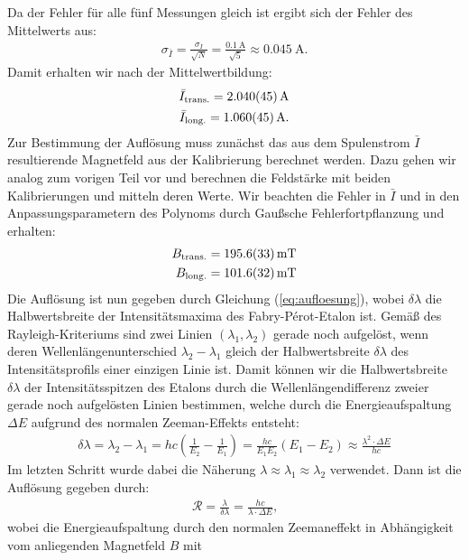 \documentclass[11pt, a4paper]{article}
\begin{document}
Da der Fehler für alle fünf Messungen gleich ist ergibt sich der Fehler des Mittelwerts aus: 
\begin{align*}
	\sigma_{\bar{I}} = \frac{\sigma_I}{\sqrt{N}} = \frac{\SI{0,1}{\ampere}}{\sqrt{5}} \approx \SI{0,045}{\ampere}\text{.}
\end{align*}
Damit erhalten wir nach der Mittelwertbildung:
\begin{align*}
	\bar{I}_\mathrm{trans.} = \SI{2.040 +- 0.045}{\ampere} \\
	\bar{I}_\mathrm{long.} = \SI{1.060 +- 0.045}{\ampere}\text{.}
\end{align*}
Zur Bestimmung der Auflösung muss zunächst das aus dem Spulenstrom $\bar{I}$ resultierende Magnetfeld aus der Kalibrierung berechnet werden.
Dazu gehen wir analog zum vorigen Teil vor und berechnen die Feldstärke mit beiden Kalibrierungen und mitteln deren Werte.
Wir beachten die Fehler in $\bar{I}$ und in den Anpassungsparametern des Polynoms durch Gaußsche Fehlerfortpflanzung und erhalten:
\begin{align*}
	B_\mathrm{trans.} = \SI{195.6 +- 3.3}{\milli\tesla} \\
	B_\mathrm{long.} = \SI{101.6 +- 3.2}{\milli\tesla}
\end{align*}
Die Auflösung ist nun gegeben durch Gleichung (\ref{eq:aufloesung}), wobei $\delta \lambda$ die Halbwertsbreite der Intensitätsmaxima des Fabry-Pérot-Etalon ist.
Gemäß des Rayleigh-Kriteriums sind zwei Linien $(\lambda_1, \lambda_2)$ gerade noch aufgelöst, wenn deren Wellenlängenunterschied $\lambda_2 - \lambda_1$ gleich der Halbwertsbreite $\delta \lambda$ des Intensitätsprofils einer einzigen Linie ist.
Damit können wir die Halbwertsbreite $\delta \lambda$ der Intensitätsspitzen des Etalons durch die Wellenlängendifferenz zweier gerade noch aufgelösten Linien bestimmen, welche durch die Energieaufspaltung $\Delta E$ aufgrund des normalen Zeeman-Effekts entsteht:
\begin{align}
	\delta \lambda = \lambda_2 - \lambda_1 = h c \left( \frac{1}{E_2} - \frac{1}{E_1} \right) = \frac{h c}{E_1 E_2} \left(E_1 - E_2\right) \approx \frac{\lambda^2 \cdot \Delta E}{h c}
\end{align}
Im letzten Schritt wurde dabei die Näherung $\lambda \approx \lambda_1 \approx \lambda_2$ verwendet.
Dann ist die Auflösung gegeben durch:
\begin{align}
	\mathcal{R} = \frac{\lambda}{\delta \lambda} = \frac{h c}{\lambda \cdot \Delta E}\text{,}
\end{align}
wobei die Energieaufspaltung durch den normalen Zeemaneffekt in Abhängigkeit vom anliegenden Magnetfeld $B$ mit
\end{document}

